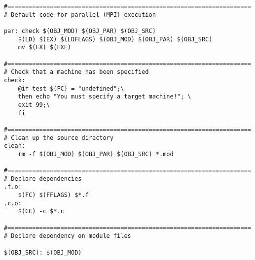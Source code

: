 \begin{verbatim}
#=====================================================================
# Default code for parallel (MPI) execution

par: check $(OBJ_MOD) $(OBJ_PAR) $(OBJ_SRC)
	$(LD) $(EX) $(LDFLAGS) $(OBJ_MOD) $(OBJ_PAR) $(OBJ_SRC)
	mv $(EX) $(EXE)

#=====================================================================
# Check that a machine has been specified
check:
	@if test $(FC) = "undefined";\
	then echo "You must specify a target machine!"; \
	exit 99;\
	fi

#=====================================================================
# Clean up the source directory
clean:
	rm -f $(OBJ_MOD) $(OBJ_PAR) $(OBJ_SRC) *.mod

#=====================================================================
# Declare dependencies
.f.o: 
	$(FC) $(FFLAGS) $*.f
.c.o: 
	$(CC) -c $*.c

#=====================================================================
# Declare dependency on module files

$(OBJ_SRC): $(OBJ_MOD)
\end{verbatim}
